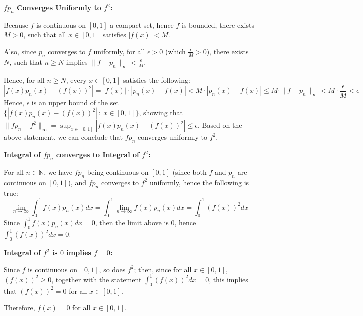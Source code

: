 \documentclass{article}
\begin{document}
\textbf{$fp_n$ Converges Uniformly to $f^2$:}

Because $f$ is continuous on $[0,1]$ a compact set, hence $f$ is bounded, there exists $M>0$, such that all $x\in[0,1]$ satisfies $|f(x)|<M$.

Also, since $p_n$ converges to $f$ uniformly, for all $\epsilon>0$ (which $\frac{\epsilon}{M}>0$), there exists $N$, such that $n\geq N$ implies $\|f-p_n\|_\infty <\frac{\epsilon}{M}$.

Hence, for all $n\geq N$, every $x\in[0,1]$ satisfies the following:
$$|f(x)p_n(x) - (f(x))^2| = |f(x)|\cdot |p_n(x)-f(x)| < M\cdot |p_n(x)-f(x)| \leq M\cdot \|f-p_n\|_\infty < M\cdot \frac{\epsilon}{M}<\epsilon$$
Hence, $\epsilon$ is an upper bound of the set $\{|f(x)p_n(x)-(f(x))^2|\ :\ x\in[0,1]\}$, showing that $\|fp_n-f^2\|_\infty = \sup_{x\in[0,1]}|f(x)p_n(x)-(f(x))^2| \leq \epsilon$.
Based on the above statement, we can conclude that $fp_n$ converges uniformly to $f^2$.

\hfill

\textbf{Integral of $fp_n$ converges to Integral of $f^2$:}

For all $n\in\mathbb{N}$, we have $fp_n$ being continuous on $[0,1]$ (since both $f$ and $p_n$ are continuous on $[0,1]$), and $fp_n$ converges to $f^2$ uniformly,
hence the following is true:
$$\lim_{n\rightarrow\infty}\int_{0}^{1}f(x)p_n(x)dx = \int_{0}^{1}\lim_{n\rightarrow\infty}f(x)p_n(x)dx = \int_{0}^{1}(f(x))^2dx$$
Since $\int_{0}^{1}f(x)p_n(x)dx = 0$, then the limit above is $0$, hence $\int_{0}^{1}(f(x))^2dx = 0$.

\hfill

\textbf{Integral of $f^2$ is $0$ implies $f=0$:}

Since $f$ is continuous on $[0,1]$, so does $f^2$; then, since for all $x\in[0,1]$, $(f(x))^2 \geq 0$, together with the statement $\int_{0}^{1}(f(x))^2dx = 0$,
this implies that $(f(x))^2 = 0$ for all $x\in[0,1]$.

Therefore, $f(x)=0$ for all $x\in[0,1]$.
\end{document}

